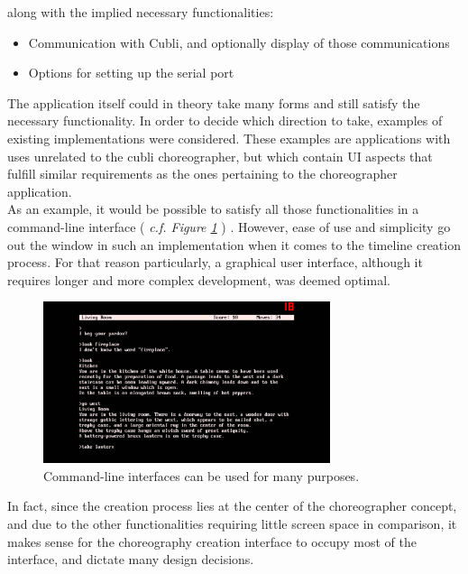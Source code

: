 along with the implied necessary functionalities:

\begin{itemize}
\item Communication with Cubli, and optionally display of those communications
\item Options for setting up the serial port
\end{itemize}


The application itself could in theory take many forms and still satisfy the necessary functionality. In order to decide which direction to take, examples of existing implementations were considered. These examples are applications with uses unrelated to the cubli choreographer, but which contain UI aspects that fulfill similar requirements as the ones pertaining to the choreographer application.\\

As an example, it would be possible to satisfy all those functionalities in a command-line interface ( \textit{c.f. Figure \ref{img:CommandLine}} ) . However, ease of use and simplicity go out the window in such an implementation when it comes to the timeline creation process. For that reason particularly, a graphical user interface, although it requires longer and more complex development, was deemed optimal.\\

\begin{figure}[ht]
   \centering
   \includegraphics[width=0.75\textwidth]{img/CommandLine.jpg}
   \caption{Command-line interfaces can be used for many purposes.}
   \label{img:CommandLine}
\end{figure}

In fact, since the creation process lies at the center of the choreographer concept, and due to the other functionalities requiring little screen space in comparison, it makes sense for the choreography creation interface to occupy most of the interface, and dictate many design decisions.\\

